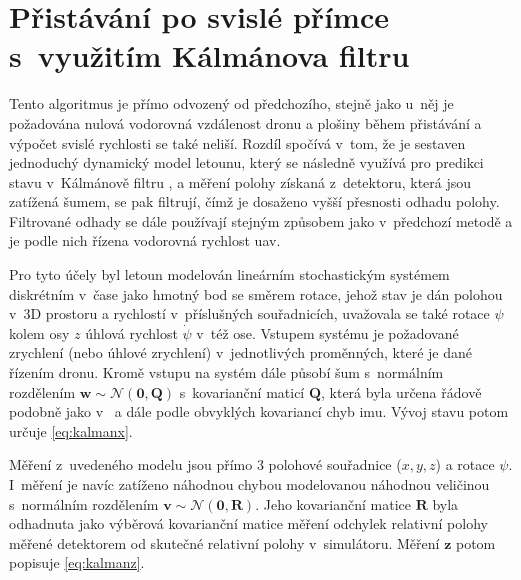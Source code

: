     \section{Přistávání po svislé přímce s~využitím Kálmánova filtru} \label{sec:kalmanoffboardpid}
        Tento algoritmus je přímo odvozený od předchozího, stejně jako u~něj je požadována nulová vodorovná vzdálenost dronu a plošiny během přistávání a výpočet svislé rychlosti se také neliší. Rozdíl spočívá v~tom, že je sestaven jednoduchý dynamický model letounu, který se následně využívá pro predikci stavu v~Kálmánově filtru \cite{Kalman1960}, \cite{Kalman1961} a měření polohy získaná z~detektoru, která jsou zatížená šumem, se pak filtrují, čímž je dosaženo vyšší přesnosti odhadu polohy. Filtrované odhady se dále používají stejným způsobem jako v~předchozí metodě a je podle nich řízena vodorovná rychlost \acrshort{uav}.

        Pro tyto účely byl letoun modelován lineárním stochastickým systémem diskrétním v~čase jako hmotný bod se směrem rotace, jehož stav je dán polohou v~3D prostoru a rychlostí v~příslušných souřadnicích, uvažovala se také rotace $\psi$ kolem osy $z$ úhlová rychlost $\dot \psi$ v~též ose. Vstupem systému je požadované zrychlení (nebo úhlové zrychlení) v~jednotlivých proměnných, které je dané řízením dronu. Kromě vstupu na systém dále působí šum s~normálním rozdělením $\mathbf{w} \sim \mathcal{N}(\mathbf{0},\mathbf{Q})$ s~kovarianční maticí $\mathbf{Q}$, která byla určena řádově podobně jako v~\cite{Kojima2015} a dále podle obvyklých kovariancí chyb \acrshort{imu}. %
        Vývoj stavu potom určuje \cref{eq:kalmanx}.

        Měření z~uvedeného modelu jsou přímo 3 polohové souřadnice ($x, y, z$) a rotace $\psi$. I~měření je navíc zatíženo náhodnou chybou modelovanou náhodnou veličinou s~normálním rozdělením $\mathbf{v} \sim \mathcal{N}(\mathbf{0},\mathbf{R})$. Jeho kovarianční matice $\mathbf{R}$ byla odhadnuta jako výběrová kovarianční matice měření odchylek relativní polohy měřené detektorem od skutečné relativní polohy v~simulátoru. Měření $\mathbf z$ potom popisuje \cref{eq:kalmanz}.

